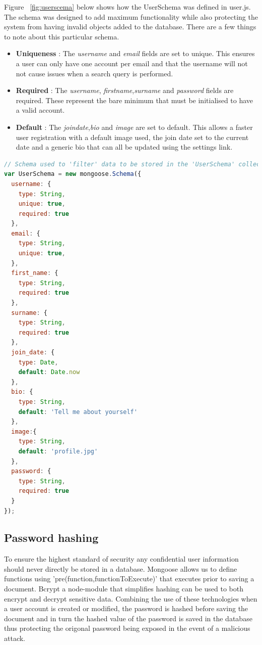 Figure ~\ref{fig:userscema} below shows how the UserSchema was defined in user.js. The schema was designed to add maximum functionality while also protecting the system from having invalid objects added to the database. There are a few things to note about this particular schema.
\begin{itemize}
\item \textbf{Uniqueness} : The \textit{username} and \textit{email} fields are set to unique. This ensures a user can only have one account per email and that the username will not not cause issues when a search query is performed.
\item \textbf{Required} : The \textit{username}, \textit{firstname},\textit{surname} and \textit{password} fields are required. These represent the bare minimum that must be initialised to have a valid account.
\item \textbf{Default} : The \textit{joindate},\textit{bio} and \textit{image} are set to default. This allows a faster user registration with a default image used, the join date set to the current date and a generic bio that can all be updated using the settings link.
\end{itemize}

\begin{lstlisting}[language=JavaScript,caption={Defining User Schema},captionpos=b,label={fig:userscema}]
// Schema used to 'filter' data to be stored in the 'UserSchema' collection in mongo
var UserSchema = new mongoose.Schema({
  username: {
    type: String,
    unique: true,
    required: true
  },
  email: {
    type: String,
    unique: true,
  },
  first_name: {
    type: String,
    required: true
  },
  surname: {
    type: String,
    required: true
  },
  join_date: {
    type: Date,
    default: Date.now
  },
  bio: {
    type: String,
    default: 'Tell me about yourself'
  },
  image:{
    type: String,
    default: 'profile.jpg'
  },
  password: {
    type: String,
    required: true
  }
});

\end{lstlisting}

\subsection{Password hashing}
To ensure the highest standard of security any confidential user information should never directly be stored in a database. Mongoose allows us to define functions using 'pre(function,functionToExecute)' that executes prior to saving a document. Bcrypt a node-module that simplifies hashing can be used to both encrypt and decrypt sensitive data. Combining the use of these technologies when a user account is created or modified, the password is hashed before saving the document and in turn the hashed value of the password is saved in the database thus protecting the origonal password being exposed in the event of a malicious attack.

